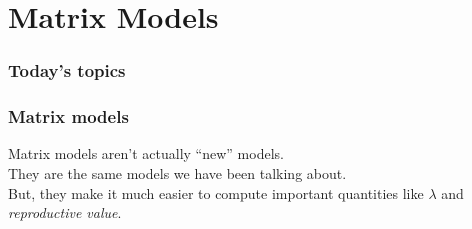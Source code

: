 \documentclass[color=usenames,dvipsnames]{beamer}\usepackage[]{graphicx}\usepackage[]{color}
\begin{document}
















\section{Matrix Models}



\begin{frame}[plain]
  \frametitle{Today's topics}
  \tableofcontents[currentsection]
\end{frame}




\begin{frame}
  \frametitle{Matrix models}
  \Large
  Matrix models aren't actually ``new'' models. \\
  \pause
  \vfill
  They are the same models we have been talking about. \\
  \pause
  \vfill
  But, they make it much easier to compute important
  quantities like $\lambda$ and {\it reproductive value}. \\
\end{frame}
\end{document}

